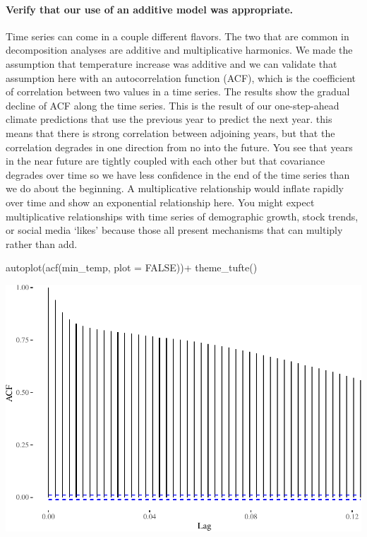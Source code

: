 \documentclass[
  paper=a4,
  ,captions=tableheading
]{scrartcl}
\newenvironment{Shaded}{\begin{snugshade}}{\end{snugshade}}
\newcommand{\AttributeTok}[1]{\textcolor[rgb]{0.77,0.63,0.00}{#1}}
\newcommand{\ConstantTok}[1]{\textcolor[rgb]{0.00,0.00,0.00}{#1}}
\newcommand{\FunctionTok}[1]{\textcolor[rgb]{0.00,0.00,0.00}{#1}}
\newcommand{\NormalTok}[1]{#1}
\newcommand{\SpecialCharTok}[1]{\textcolor[rgb]{0.00,0.00,0.00}{#1}}
\begin{document}
\hypertarget{verify-that-our-use-of-an-additive-model-was-appropriate.}{%
\paragraph{Verify that our use of an additive model was
appropriate.}\label{verify-that-our-use-of-an-additive-model-was-appropriate.}}

Time series can come in a couple different flavors. The two that are
common in decomposition analyses are additive and multiplicative
harmonics. We made the assumption that temperature increase was additive
and we can validate that assumption here with an autocorrelation
function (ACF), which is the coefficient of correlation between two
values in a time series. The results show the gradual decline of ACF
along the time series. This is the result of our one-step-ahead climate
predictions that use the previous year to predict the next year. this
means that there is strong correlation between adjoining years, but that
the correlation degrades in one direction from no into the future. You
see that years in the near future are tightly coupled with each other
but that covariance degrades over time so we have less confidence in the
end of the time series than we do about the beginning. A multiplicative
relationship would inflate rapidly over time and show an exponential
relationship here. You might expect multiplicative relationships with
time series of demographic growth, stock trends, or social media `likes'
because those all present mechanisms that can multiply rather than add.

\begin{Shaded}
\begin{Highlighting}[]
\FunctionTok{autoplot}\NormalTok{(}\FunctionTok{acf}\NormalTok{(min\_temp, }\AttributeTok{plot =} \ConstantTok{FALSE}\NormalTok{))}\SpecialCharTok{+} \FunctionTok{theme\_tufte}\NormalTok{()}
\end{Highlighting}
\end{Shaded}

\includegraphics{Haskell_files/figure-latex/unnamed-chunk-57-1.pdf}
\end{document}

